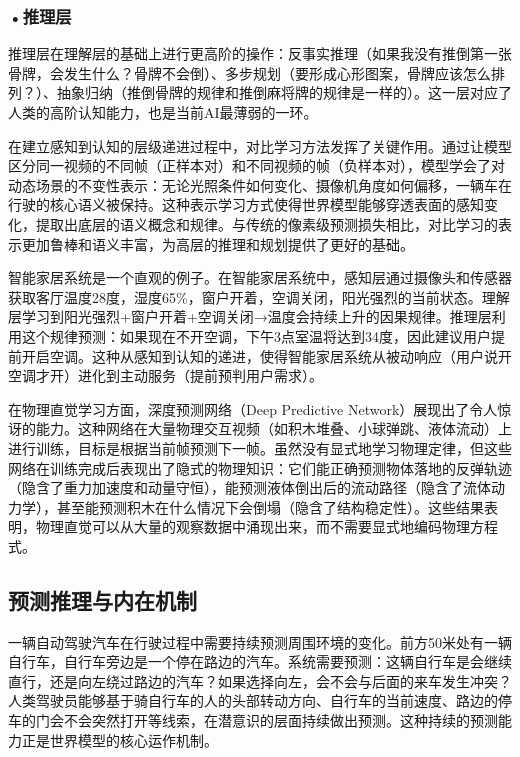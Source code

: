 \subsubsection*{\textbf{•推理层}}

推理层在理解层的基础上进行更高阶的操作：反事实推理（如果我没有推倒第一张骨牌，会发生什么？骨牌不会倒）、多步规划（要形成心形图案，骨牌应该怎么排列？）、抽象归纳（推倒骨牌的规律和推倒麻将牌的规律是一样的）。这一层对应了人类的高阶认知能力，也是当前AI最薄弱的一环。

在建立感知到认知的层级递进过程中，对比学习方法发挥了关键作用。通过让模型区分同一视频的不同帧（正样本对）和不同视频的帧（负样本对），模型学会了对动态场景的不变性表示：无论光照条件如何变化、摄像机角度如何偏移，一辆车在行驶的核心语义被保持。这种表示学习方式使得世界模型能够穿透表面的感知变化，提取出底层的语义概念和规律。与传统的像素级预测损失相比，对比学习的表示更加鲁棒和语义丰富，为高层的推理和规划提供了更好的基础。

智能家居系统是一个直观的例子。在智能家居系统中，感知层通过摄像头和传感器获取客厅温度28度，湿度65\%，窗户开着，空调关闭，阳光强烈的当前状态。理解层学习到阳光强烈+窗户开着+空调关闭→温度会持续上升的因果规律。推理层利用这个规律预测：如果现在不开空调，下午3点室温将达到34度，因此建议用户提前开启空调。这种从感知到认知的递进，使得智能家居系统从被动响应（用户说开空调才开）进化到主动服务（提前预判用户需求）。

在物理直觉学习方面，深度预测网络（Deep Predictive Network）展现出了令人惊讶的能力。这种网络在大量物理交互视频（如积木堆叠、小球弹跳、液体流动）上进行训练，目标是根据当前帧预测下一帧。虽然没有显式地学习物理定律，但这些网络在训练完成后表现出了隐式的物理知识：它们能正确预测物体落地的反弹轨迹（隐含了重力加速度和动量守恒），能预测液体倒出后的流动路径（隐含了流体动力学），甚至能预测积木在什么情况下会倒塌（隐含了结构稳定性）。这些结果表明，物理直觉可以从大量的观察数据中涌现出来，而不需要显式地编码物理方程式。






\subsection{预测推理与内在机制}
一辆自动驾驶汽车在行驶过程中需要持续预测周围环境的变化。前方50米处有一辆自行车，自行车旁边是一个停在路边的汽车。系统需要预测：这辆自行车是会继续直行，还是向左绕过路边的汽车？如果选择向左，会不会与后面的来车发生冲突？人类驾驶员能够基于骑自行车的人的头部转动方向、自行车的当前速度、路边的停车的门会不会突然打开等线索，在潜意识的层面持续做出预测。这种持续的预测能力正是世界模型的核心运作机制。

